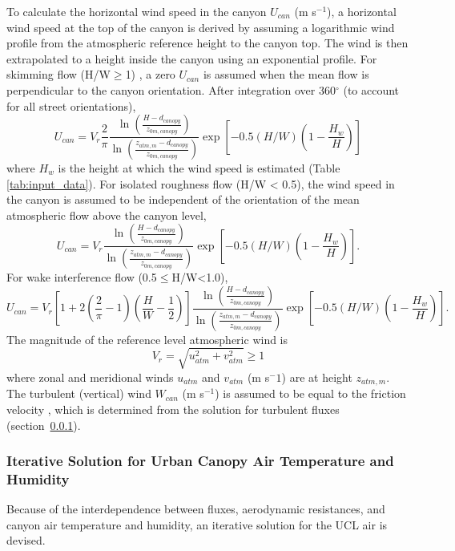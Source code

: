 \documentclass[12pt,authoryear]{elsarticle}
\numberwithin{equation}{section} %
\begin{document}
To calculate the horizontal wind speed in the canyon $U_{can}$ (m s$^{-1}$), a horizontal wind speed at the top of the canyon is derived by assuming a logarithmic wind profile from the atmospheric reference height to the canyon top. The wind is then extrapolated to a height inside the canyon using an exponential profile. For skimming flow (H/W$\geq$1) \cite{okeBoundaryLayerClimates1987}, a zero $U_{can}$ is assumed when the mean flow is perpendicular to the canyon orientation. After integration over 360$^\circ$ (to account for all street orientations),
\begin{equation}
U_{can} = V_{r}\frac{2}{\pi}\frac{\ln\left(\frac{H-d_{canopy}}{z_{0m,canopy}}\right)}{\ln\left(\frac{z_{atm,m}-d_{canopy}}{z_{0m,canopy}}\right)}\exp \left[-0.5(H/W)\left(1-\frac{H_{w}}{H}\right)\right]
\end{equation}
where $H_{w}$ is the height at which the wind speed is estimated (Table \ref{tab:input_data}). For isolated roughness flow (H/W < 0.5), the wind speed in the canyon is assumed to be independent of the orientation of the mean atmospheric flow above the canyon level,
\begin{equation}
U_{can} = V_{r}\frac{\ln\left(\frac{H-d_{canopy}}{z_{0m,canopy}}\right)}{\ln\left(\frac{z_{atm,m}-d_{canopy}}{z_{0m,canopy}}\right)}\exp \left[-0.5(H/W)\left(1-\frac{H_{w}}{H}\right)\right].
\end{equation}
For wake interference flow (0.5$\leq$H/W<1.0),
\begin{equation}
U_{can} = V_{r}\left[1+2\left(\frac{2}{\pi}-1\right)\left(\frac{H}{W}-\frac{1}{2}\right)\right]\frac{\ln\left(\frac{H-d_{canopy}}{z_{0m,canopy}}\right)}{\ln\left(\frac{z_{atm,m}-d_{canopy}}{z_{0m,canopy}}\right)}\exp \left[-0.5(H/W)\left(1-\frac{H_{w}}{H}\right)\right].
\end{equation}
The magnitude of the reference level atmospheric wind is
\begin{equation}
V_{r} = \sqrt{u_{atm}^2+v_{atm}^2} \geq1
\end{equation}
where zonal and meridional winds $u_{atm}$ and $v_{atm}$ (m s$^-1$) are at height $z_{atm,m}$. The turbulent (vertical) wind $W_{can}$ (m s$^{-1}$) is assumed to be equal to the friction velocity \cite{massonPhysicallyBasedSchemeUrban2000}, which is determined from the solution for turbulent fluxes (section~\ref{sec:iteration}).

\subsubsection{Iterative Solution for Urban Canopy Air Temperature and Humidity}
\label{sec:iteration}
Because of the interdependence between fluxes, aerodynamic resistances, and canyon air temperature and humidity, an iterative solution for the UCL air is devised.
\end{document}

